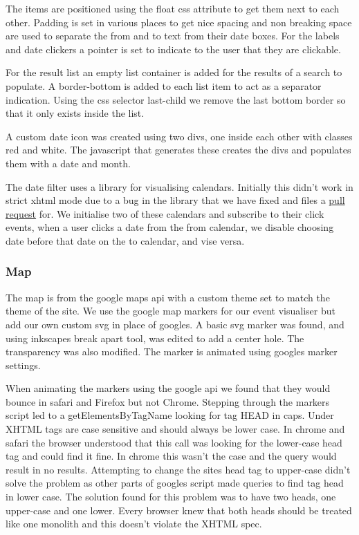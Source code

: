 \documentclass[10pt]{article}
\begin{document}
                The items are positioned using the float css attribute to get them next to each other. Padding is set in various places to get nice spacing and non breaking space are used to separate the from and to text from their date boxes. For the labels and date clickers a pointer is set to indicate to the user that they are clickable.

                For the result list an empty list container is added for the results of a search to populate. A border-bottom is added to each list item to act as a separator indication. Using the css selector last-child we remove the last bottom border so that it only exists inside the list.

                A custom date icon was created using two divs, one inside each other with classes red and white. The javascript that generates these creates the divs and populates them with a date and month.

                The date filter uses a library for visualising calendars. Initially this didn't work in strict xhtml mode due to a bug in the library that we have fixed and files a \href{https://github.com/dbushell/Pikaday/pull/526}{pull request} for. We initialise two of these calendars and subscribe to their click events, when a user clicks a date from the from calendar, we disable choosing date before that date on the to calendar, and vise versa.

            \subsubsection{Map}
                The map is from the google maps api with a custom theme set to match the theme of the site. We use the google map markers for our event visualiser but add our own custom svg in place of googles. A basic svg marker was found, and using inkscapes break apart tool, was edited to add a center hole. The transparency was also modified. The marker is animated using googles marker settings.

                When animating the markers using the google api we found that they would bounce in safari and Firefox but not Chrome. Stepping through the markers script led to a getElementsByTagName looking for tag HEAD in caps. Under XHTML tags are case sensitive and should always be lower case. In chrome and safari the browser understood that this call was looking for the lower-case head tag and could find it fine. In chrome this wasn't the case and the query would result in no results. Attempting to change the sites head tag to upper-case didn't solve the problem as other parts of googles script made queries to find tag head in lower case. The solution found for this problem was to have two heads, one upper-case and one lower. Every browser knew that both heads should be treated like one monolith and this doesn't violate the XHTML spec.
\end{document}
